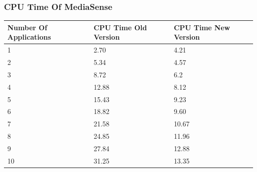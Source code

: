 \subsubsection{CPU Time Of MediaSense}
\begin{center}
    \begin{tabular}[t!]{ | l | l | l |}
    \hline
    Number Of Applications								& CPU Time Old Version					& CPU Time New Version\\ \hline
    1 													& 2.70									& 4.21\\ \hline
    2 													& 5.34									& 4.57\\ \hline
    3 													& 8.72									& 6.2\\ \hline
    4 													& 12.88									& 8.12\\ \hline
    5 													& 15.43									& 9.23\\ \hline
    6 													& 18.82									& 9.60\\ \hline
    7 													& 21.58									& 10.67\\ \hline
    8 													& 24.85									& 11.96\\ \hline
    9 													& 27.84									& 12.88	\\ \hline
    10 													& 31.25									& 13.35\\ \hline
    \end{tabular}
\end{center}
\clearpage

